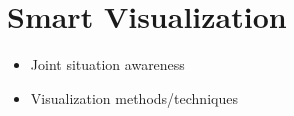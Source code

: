 \chapter{Smart Visualization}

  \begin{itemize}
\item Joint situation awareness
\item Visualization methods/techniques
\end{itemize}
  
  
  
  
